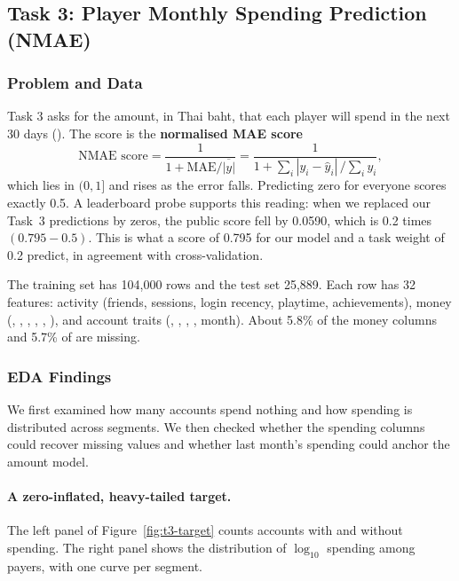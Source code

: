 \documentclass[../main.tex]{subfiles}
\begin{document}
\graphicspath{{figures/}{task3/figures/}}
\begingroup
\captionsetup[table]{justification=raggedright,singlelinecheck=false}

\subsection{Task 3: Player Monthly Spending Prediction (NMAE)}
\label{sec:t3}

\subsubsection{Problem and Data}

Task 3 asks for the amount, in Thai baht, that each player will spend in the next 30 days (). The score is the \textbf{normalised MAE score}
\[
\text{NMAE score}=\frac{1}{1+\mathrm{MAE}/\overline{|y|}}=\frac{1}{1+\sum_i|y_i-\hat y_i|\,/\sum_i y_i},
\]
which lies in $(0,1]$ and rises as the error falls. Predicting zero for everyone scores exactly 0.5. A leaderboard probe supports this reading: when we replaced our Task~3 predictions by zeros, the public score fell by 0.0590, which is 0.2 times $(0.795-0.5)$. This is what a score of 0.795 for our model and a task weight of 0.2 predict, in agreement with cross-validation.

The training set has 104{,}000 rows and the test set 25{,}889. Each row has 32 features: activity (friends, sessions, login recency, playtime, achievements), money (, , , , , ), and account traits (, , , , month). About 5.8\% of the money columns and 5.7\% of  are missing.

\subsubsection{EDA Findings}
\label{sec:t3-eda}

We first examined how many accounts spend nothing and how spending is distributed across segments. We then checked whether the spending columns could recover missing values and whether last month's spending could anchor the amount model.

\paragraph{A zero-inflated, heavy-tailed target.} The left panel of Figure~\ref{fig:t3-target} counts accounts with and without spending. The right panel shows the distribution of $\log_{10}$ spending among payers, with one curve per segment.
\end{document}
